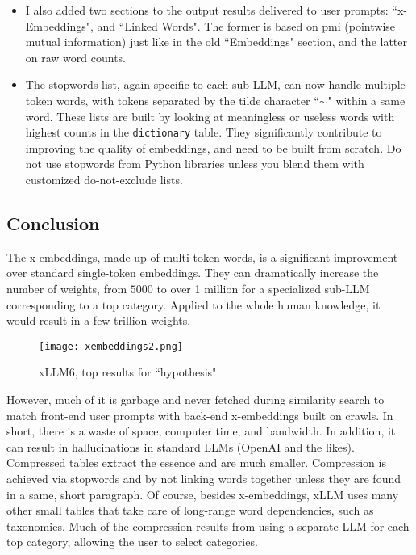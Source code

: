 \documentclass[oneside,10pt]{book}
\begin{document}
\begin{itemize}
\item I also added two sections to the output results delivered to user prompts: ``x-Embeddings", and ``Linked Words". The former is based
 on \textcolor{index}{pmi} (pointwise mutual information) just like in the old ``Embeddings" section, and the latter on raw word counts.  
\vspace{1ex}
\item The stopwords list, again specific to each sub-LLM, can now handle multiple-token words, with tokens separated by the tilde character ``$\sim$" within a same word.
These lists are built by looking at meaningless or useless words with highest counts in the \texttt{dictionary} table. They significantly contribute to
 improving the quality of embeddings, and need to be built from scratch. Do not use stopwords from Python libraries unless you blend them with
 customized do-not-exclude lists. 

\vspace{1ex}
\end{itemize}



\subsection{Conclusion}

The x-embeddings, made up of multi-token words, is a significant improvement over standard single-token embeddings.
They can dramatically increase the number of weights, from $\num{5000}$ to over 1 million for a specialized sub-LLM
 corresponding to a top category. Applied to the whole human knowledge, it would result in a few trillion weights.   

\begin{figure}[H]
\centering
\texttt{[image: xembeddings2.png]}
\caption{xLLM6, top results for ``hypothesis"}
\label{fig:xembeddings}
\end{figure}


However, much of it is garbage and never fetched during similarity search 
to match front-end user prompts with back-end x-embeddings built on crawls. In short, there is a waste of space, computer time,  and bandwidth. In addition, it can result in hallucinations in standard LLMs (OpenAI and the likes). Compressed tables extract the essence and are much smaller. Compression is
 achieved via stopwords and by not linking words together unless they are found in a same, short paragraph. Of course, besides x-embeddings,
 xLLM uses many other small tables that take care of long-range word dependencies, such as taxonomies. Much of the compression results from using 
 a separate LLM for each top category, allowing the user to select categories. 
\end{document}
